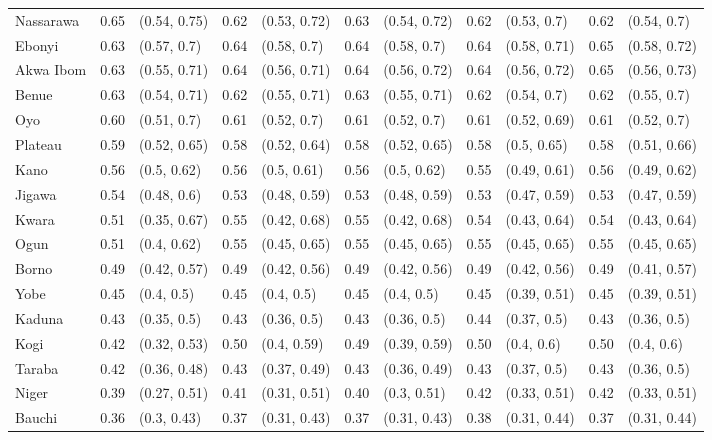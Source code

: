 \begin{tabular}{lrlrlrlrlrl}
Nassarawa & 0.65 & (0.54, 0.75) & 0.62 & (0.53, 0.72) & 0.63 & (0.54, 0.72) & 0.62 & (0.53, 0.7) & 0.62 & (0.54, 0.7)\\
Ebonyi & 0.63 & (0.57, 0.7) & 0.64 & (0.58, 0.7) & 0.64 & (0.58, 0.7) & 0.64 & (0.58, 0.71) & 0.65 & (0.58, 0.72)\\
Akwa Ibom & 0.63 & (0.55, 0.71) & 0.64 & (0.56, 0.71) & 0.64 & (0.56, 0.72) & 0.64 & (0.56, 0.72) & 0.65 & (0.56, 0.73)\\
Benue & 0.63 & (0.54, 0.71) & 0.62 & (0.55, 0.71) & 0.63 & (0.55, 0.71) & 0.62 & (0.54, 0.7) & 0.62 & (0.55, 0.7)\\
Oyo & 0.60 & (0.51, 0.7) & 0.61 & (0.52, 0.7) & 0.61 & (0.52, 0.7) & 0.61 & (0.52, 0.69) & 0.61 & (0.52, 0.7)\\
Plateau & 0.59 & (0.52, 0.65) & 0.58 & (0.52, 0.64) & 0.58 & (0.52, 0.65) & 0.58 & (0.5, 0.65) & 0.58 & (0.51, 0.66)\\
Kano & 0.56 & (0.5, 0.62) & 0.56 & (0.5, 0.61) & 0.56 & (0.5, 0.62) & 0.55 & (0.49, 0.61) & 0.56 & (0.49, 0.62)\\
Jigawa & 0.54 & (0.48, 0.6) & 0.53 & (0.48, 0.59) & 0.53 & (0.48, 0.59) & 0.53 & (0.47, 0.59) & 0.53 & (0.47, 0.59)\\
Kwara & 0.51 & (0.35, 0.67) & 0.55 & (0.42, 0.68) & 0.55 & (0.42, 0.68) & 0.54 & (0.43, 0.64) & 0.54 & (0.43, 0.64)\\
Ogun & 0.51 & (0.4, 0.62) & 0.55 & (0.45, 0.65) & 0.55 & (0.45, 0.65) & 0.55 & (0.45, 0.65) & 0.55 & (0.45, 0.65)\\
Borno & 0.49 & (0.42, 0.57) & 0.49 & (0.42, 0.56) & 0.49 & (0.42, 0.56) & 0.49 & (0.42, 0.56) & 0.49 & (0.41, 0.57)\\
Yobe & 0.45 & (0.4, 0.5) & 0.45 & (0.4, 0.5) & 0.45 & (0.4, 0.5) & 0.45 & (0.39, 0.51) & 0.45 & (0.39, 0.51)\\
Kaduna & 0.43 & (0.35, 0.5) & 0.43 & (0.36, 0.5) & 0.43 & (0.36, 0.5) & 0.44 & (0.37, 0.5) & 0.43 & (0.36, 0.5)\\
Kogi & 0.42 & (0.32, 0.53) & 0.50 & (0.4, 0.59) & 0.49 & (0.39, 0.59) & 0.50 & (0.4, 0.6) & 0.50 & (0.4, 0.6)\\
Taraba & 0.42 & (0.36, 0.48) & 0.43 & (0.37, 0.49) & 0.43 & (0.36, 0.49) & 0.43 & (0.37, 0.5) & 0.43 & (0.36, 0.5)\\
Niger & 0.39 & (0.27, 0.51) & 0.41 & (0.31, 0.51) & 0.40 & (0.3, 0.51) & 0.42 & (0.33, 0.51) & 0.42 & (0.33, 0.51)\\
Bauchi & 0.36 & (0.3, 0.43) & 0.37 & (0.31, 0.43) & 0.37 & (0.31, 0.43) & 0.38 & (0.31, 0.44) & 0.37 & (0.31, 0.44)\\

\end{tabular}
